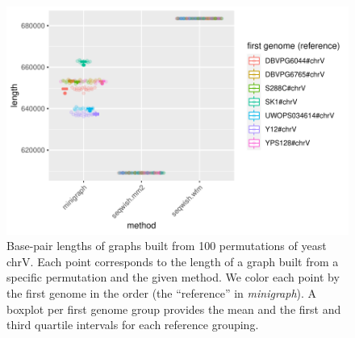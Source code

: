 \begin{figure}[b]
   \includegraphics[width=\linewidth]{yeast_chrV_length_vs_100orders}
   \caption{
     Base-pair lengths of graphs built from 100 permutations of yeast chrV.
     Each point corresponds to the length of a graph built from a specific permutation and the given method.
     We color each point by the first genome in the order (the ``reference'' in \textit{minigraph}).
     A boxplot per first genome group provides the mean and the first and third quartile intervals for each reference grouping.
    }
    \label{fig:yeast}
\end{figure}
